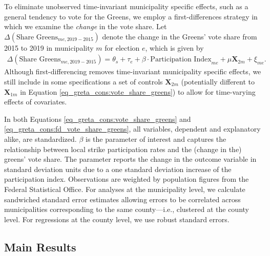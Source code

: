 To eliminate unobserved time-invariant municipality specific effects, such as a general tendency to vote for the Greens, we employ a first-differences strategy in which we examine the \textit{change} in the vote share. Let $\Delta(\text{Share Greens}_{me,2019-2015})$ denote the change in the Greens' vote share from 2015 to 2019 in municipality $m$ for election $e$, which is given by
\begin{align}
	\Delta(\text{Share Greens}_{me,2019-2015}) = \theta_s + \tau_e + \beta\cdot\text{Participation Index}_{me} + \mu \mathbf{X}_{2m} + \xi_{me}.\label{eq_greta_cons:fd_vote_share_greens}
\end{align}
Although first-differencing removes time-invariant municipality specific effects, we still include in some specifications a set of controls $\mathbf{X}_{2m}$ (potentially different to $\mathbf{X}_{1m}$ in Equation \ref{eq_greta_cons:vote_share_greens}) to allow for time-varying effects of covariates.


In both Equations \ref{eq_greta_cons:vote_share_greens} and \ref{eq_greta_cons:fd_vote_share_greens}, all variables, dependent and explanatory alike, are standardized. $\beta$ is the parameter of interest and captures the relationship between local strike participation rates and the (change in the) greens' vote share. The parameter reports the change in the outcome variable in standard deviation units due to a one standard deviation increase of the participation index. Observations are weighted by population figures from the Federal Statistical Office. For analyses at the municipality level, we calculate sandwiched standard error estimates allowing errors to be correlated across municipalities corresponding to the same county---i.e., clustered at the county level. For regressions at the county level, we use robust standard errors.





\subsection{Main Results}

\afterpage{



}


